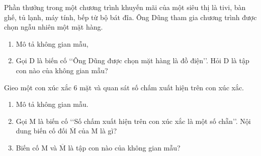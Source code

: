 \begin{vd}%
	Phần thưởng trong một chương trình khuyến mãi của một siêu thị là tivi, bàn ghế, tủ lạnh, máy tính, bếp từ bộ bát đĩa. Ông Dũng tham gia chương trình được chọn ngẫu nhiên một mặt hàng.
	\begin{enumerate}
		\item Mô tả không gian mẫu,
		\item Gọi $ \mathrm{D} $ là biến cố \lq\lq Ông Dũng được chọn mặt hàng là đồ điện\rq\rq. Hỏi $ \mathrm{D} $ là tập con nào của không gian mẫu?
	\end{enumerate}
\end{vd}

\begin{vd}%
	Gieo một con xúc xắc $ 6 $ mặt và quan sát số chấm xuất hiện trên con xúc xắc.
	\begin{enumerate}
		\item Mô tả không gian mẫu.
		\item Gọi $ \mathrm{M} $ là biến cố \lq\lq Số chấm xuất hiện trên con xúc xắc là một số chẵn\rq\rq. Nội dung biến cố đối $\mathrm{\overline{M}}$ của $ \mathrm{M} $ là gì?
		\item Biến cố $ \mathrm{M} $ và $\mathrm{\overline{M}}$ là tập con nào của không gian mẫu?
	\end{enumerate}
\end{vd}

